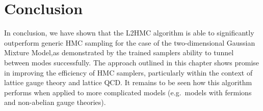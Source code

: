 \documentclass[../main.tex]{subfiles}
\newcommand{\lfop}{\mathbf{L}_{\theta}}
\begin{document}
%

% 
\section{Conclusion}%
\label{sec:l2hmc_conclusion}
%
In conclusion, we have shown that the L2HMC algorithm is able to significantly outperform generic HMC sampling for the
case of the two-dimensional Gaussian Mixture Model,\@ as demonstrated by the trained samplers ability to tunnel between
modes successfully.
%
The approach outlined in this chapter shows promise in improving the efficiency of HMC samplers, particularly within
the context of lattice gauge theory and lattice QCD.
%
It remains to be seen how this algorithm performs when applied to more complicated models (e.g.\ models with fermions
and non-abelian gauge theories).
%
\end{document}
